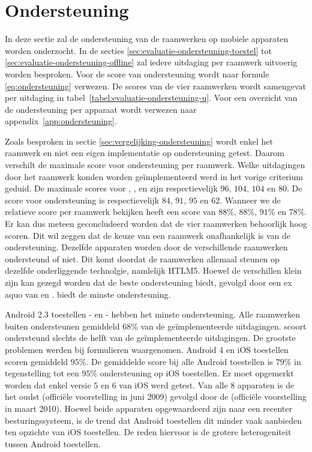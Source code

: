 \section{Ondersteuning}
\label{sec:evaluatie-ondersteuning}

In deze sectie zal de ondersteuning van de raamwerken op mobiele apparaten worden onderzocht.
In de secties \ref{sec:evaluatie-ondersteuning-toestel} tot \ref{sec:evaluatie-ondersteuning-offline} zal iedere uitdaging per raamwerk uitvoerig worden besproken.
Voor de score van ondersteuning wordt naar formule \ref{eq:ondersteuning} verwezen.
De scores van de vier raamwerken wordt samengevat per uitdaging in tabel~\ref{tabel:evaluatie-ondersteuning-u}.
Voor een overzicht van de ondersteuning per apparaat wordt verwezen naar appendix~\ref{app:ondersteuning}.

Zoals besproken in sectie \ref{sec:vergelijking-ondersteuning} wordt enkel het raamwerk en niet een eigen implementatie op ondersteuning getest.
Daarom verschilt de maximale score voor ondersteuning per raamwerk.
Welke uitdagingen door het raamwerk konden worden geïmplementeerd werd in het vorige criterium geduid.
De maximale scores voor \st{},  \kendo{},  \jqm{} en \lungo{} zijn respectievelijk $96$, $104$, $104$ en $80$.
De score voor ondersteuning is respectievelijk $84$, $91$, $95$ en $62$.
Wanneer we de relatieve score per raamwerk bekijken heeft \st{} een score van $88\%$,  \kendo{} $88\%$,  \jqm{} $91\%$ en \lungo $78\%$.
Er kan dus meteen geconcludeerd worden dat de vier raamwerken behoorlijk hoog scoren.
Dit wil zeggen dat de keuze van een raamwerk onafhankelijk is van de ondersteuning.
Dezelfde apparaten worden door de verschillende raamwerken ondersteund of niet.
Dit komt doordat de raamwerken allemaal steunen op dezelfde onderliggende technolgie, namlelijk HTLM5.
Hoewel de verschillen klein zijn kan gezegd worden dat \jqm{} de beste ondersteuning biedt,  gevolgd door een ex aquo van \st{} en \kendo{}.
\lungo{} biedt de minste ondersteuning.

Android 2.3 toestellen - \htc{} en \gtab{} - hebben het minste ondersteuning.
Alle raamwerken buiten \lungo{} ondersteunen gemiddeld $68\%$ van de geïmplementeerde uitdagingen.
\lungo{} scoort ondersteund slechts de helft van de geïmplementeerde uitdagingen.
De grootste problemen werden bij formulieren waargenomen.
Android 4 en iOS toestellen scoren gemiddeld $95\%$.
De gemiddelde score bij alle Android toestellen is $79\%$ in tegenstelling tot een $95\%$ ondersteuning op iOS toestellen.
Er moet opgemerkt worden dat enkel versie $5$ en $6$ van iOS werd getest.
Van alle $8$ apparaten is de \iphoneiii{} het oudst (officiële voorstelling in juni 2009) gevolgd door de \gs{} (officiële voorstelling in maart 2010). %
Hoewel beide apparaten opgewaardeerd zijn naar een recenter besturingssysteem, is de trend dat Android toestellen dit minder vaak aanbieden ten opzichte van iOS toestellen. %
De reden hiervoor is de grotere heterogeniteit tussen Android toestellen.

